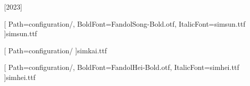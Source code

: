 [2023]

\setmainfont{Times New Roman}

    


[
    Path=configuration/,
    BoldFont=FandolSong-Bold.otf,
    ItalicFont=simsun.ttf
    ]{simsun.ttf}

[
    Path=configuration/
    ]{simkai.ttf}
    
[
    Path=configuration/,
    BoldFont=FandolHei-Bold.otf,
    ItalicFont=simhei.ttf
    ]{simhei.ttf}

\newcommand\kaishu{\CJKfamily{kai}}
\newcommand\songti{\CJKfamily{song}}
\newcommand\heiti{\CJKfamily{hei}}
